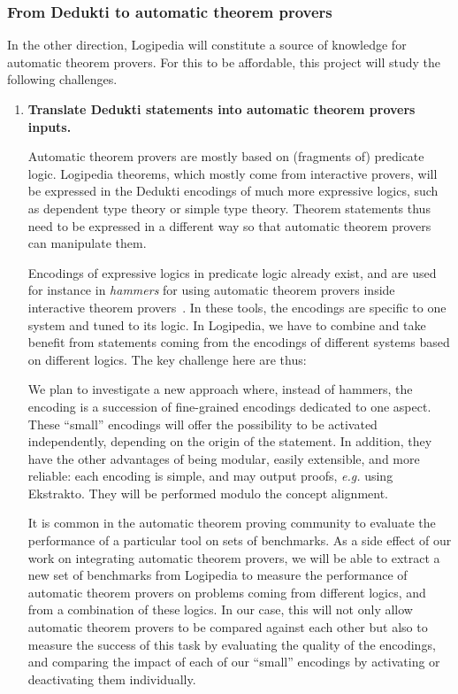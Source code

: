 \subsubsection*{From Dedukti to automatic theorem provers}

In the other direction, Logipedia will constitute a source of
knowledge for automatic theorem provers. For this to be affordable,
this project will study the following challenges.

\begin{enumerate}[\bf(a)]
\item{\bf Translate Dedukti statements into automatic theorem provers
  inputs.}

Automatic theorem provers are mostly based on (fragments of) predicate
logic.  Logipedia theorems, which mostly come from interactive
provers, will be expressed in the Dedukti encodings of much more
expressive logics, such as dependent type theory or simple type
theory.  Theorem statements thus need to be expressed in a different way
so that automatic theorem provers can manipulate them.

Encodings of expressive logics in predicate logic already exist, and are used
for instance in \emph{hammers} for using automatic theorem provers inside
interactive theorem
provers~\cite{DBLP:conf/lpar/PaulsonB10,DBLP:journals/jar/CzajkaK18}.  In these
tools, the encodings are specific to one system and tuned to its logic. In
Logipedia, we have to combine and take benefit from statements coming from the
encodings of different systems based on different logics. The key challenge here
are thus:

We plan to investigate a new approach where, instead of hammers, the
encoding is a succession of fine-grained encodings dedicated to one
aspect. These ``small'' encodings will offer the possibility to be
activated independently, depending on the origin of the statement. In
addition, they have the other advantages of being modular, easily
extensible, and more reliable: each encoding is simple, and may output
proofs, \emph{e.g.} using Ekstrakto. They will be performed modulo the
concept alignment.

It is common in the automatic theorem proving community to evaluate
the performance of a particular tool on sets of benchmarks. As a side
effect of our work on integrating automatic theorem provers, we will
be able to extract a new set of benchmarks from Logipedia to measure
the performance of automatic theorem provers on problems coming from
different logics, and from a combination of these logics. In our case,
this will not only allow automatic theorem provers to be compared against
each other but also
to measure the success of this task by evaluating the quality of the
encodings, and comparing the impact of each of our ``small'' encodings
by activating or deactivating them individually.


\end{enumerate}
